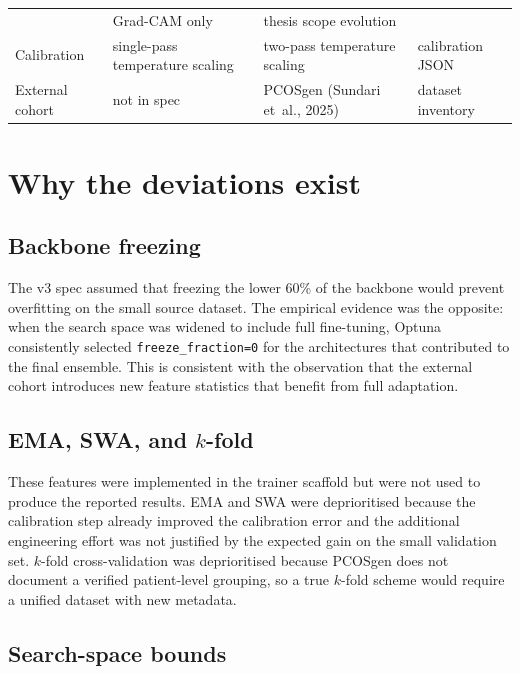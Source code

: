 \documentclass[../preamble.tex]{subfiles}
\begin{document}
\begin{table}[htbp]
\begin{tabularx}{\linewidth}{@{}lXXX@{}}
                                   & Grad-CAM only
                                   & thesis scope evolution \\
    Calibration                   & single-pass temperature scaling
                                   & two-pass temperature scaling
                                   & calibration JSON \\
    External cohort              & not in spec
                                   & PCOSgen (Sundari et~al., 2025)
                                   & dataset inventory \\
    \bottomrule
  \end{tabularx}
\end{table}

\section{Why the deviations exist}
\label{app:intended-why-deviations}

\subsection*{Backbone freezing}

The v3 spec assumed that freezing the lower 60\% of the backbone would
prevent overfitting on the small source dataset. The empirical evidence was
the opposite: when the search space was widened to include full
fine-tuning, Optuna consistently selected \texttt{freeze\_fraction=0} for
the architectures that contributed to the final ensemble. This is consistent
with the observation that the external cohort introduces new feature
statistics that benefit from full adaptation.

\subsection*{EMA, SWA, and $k$-fold}

These features were implemented in the trainer scaffold but were not used
to produce the reported results. EMA and SWA were deprioritised because the
calibration step already improved the calibration error and the additional
engineering effort was not justified by the expected gain on the small
validation set. $k$-fold cross-validation was deprioritised because
PCOSgen does not document a verified patient-level grouping, so a true
$k$-fold scheme would require a unified dataset with new metadata.

\subsection*{Search-space bounds}
\end{document}
